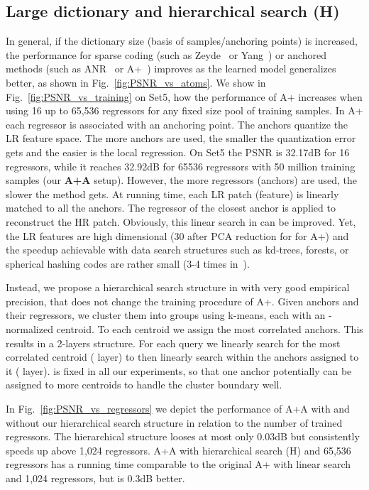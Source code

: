 \documentclass[10pt,twocolumn,letterpaper]{article}
\begin{document}
\subsection{Large dictionary and hierarchical search (H)}
\label{ssc:large}
In general, if the dictionary size (basis of samples/anchoring points) is increased, the performance for sparse coding (such as Zeyde~\cite{Zeyde-CS-2012} or Yang~\cite{Yang-CVPR-2008}) or anchored methods (such as ANR~\cite{Timofte-ICCV-2013} or A+~\cite{Timofte-ACCV-2014}) improves as the learned model generalizes better, as shown in Fig.~\ref{fig:PSNR_vs_atoms}.
We show in Fig.~\ref{fig:PSNR_vs_training} on Set5,  how the performance of A+ increases when using 16 up to 65,536 regressors for any fixed size pool of training samples. In A+ each regressor is associated with an anchoring point. The anchors quantize the LR feature space. The more anchors are used, the smaller the quantization error gets and the easier is the local regression. On Set5 the PSNR is 32.17dB for 16 regressors, while it reaches 32.92dB for 65536 regressors with 50 million training samples (our \textbf{A+A} setup). However, the more regressors (anchors) are used, the slower the method gets. At running time, each LR patch (feature) is linearly matched to all the anchors. The regressor of the closest anchor is applied to reconstruct the HR patch. Obviously, this linear search in  can be improved.
Yet, the LR features are high dimensional (30 after PCA reduction for  for A+) and the speedup achievable with data search structures such as kd-trees, forests, or spherical hashing codes are rather small (3-4 times in~\cite{Perez-ACCV-2014,Schulter-CVPR-2015}).

Instead, we propose a hierarchical search structure in  with very good empirical precision, that does not change the training procedure of A+. Given  anchors and their  regressors, we cluster them into  groups using k-means, each with an -normalized centroid. To each centroid we assign the  most correlated anchors. This results in a 2-layers structure. For each query we linearly search for the most correlated centroid ( layer) to then linearly search within the anchors assigned to it ( layer).  is fixed in all our experiments, so that one anchor potentially can be assigned to more centroids to handle the cluster boundary well.

In Fig.~\ref{fig:PSNR_vs_regressors} we depict the performance of A+A with and without our hierarchical search structure in relation to the number of trained regressors. The hierarchical structure looses at most only 0.03dB but consistently speeds up above 1,024 regressors. A+A with hierarchical search (H) and 65,536 regressors has a running time comparable to the original A+ with linear search and 1,024 regressors, but is 0.3dB better. 
\end{document}
